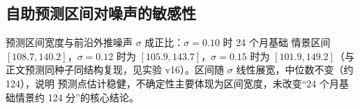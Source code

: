 \subsection{自助预测区间对噪声的敏感性}

\begin{sloppypar}%
预测区间宽度与前沿外推噪声 $\sigma$ 成正比：$\sigma=0.10$ 时 24 个月基础
情景区间 $[108.7,140.2]$，$\sigma=0.12$ 时为 $[105.9,143.7]$，$\sigma=0.15$
时为 $[101.9,149.2]$（与正文预测同种子同结构复现，见实验 v16）。区间随
$\sigma$ 线性展宽，中位数不变（约 124），说明
预测点估计稳健，不确定性主要体现为区间宽度，未改变``24 个月基础情景约 124
分''的核心结论。
\end{sloppypar}

